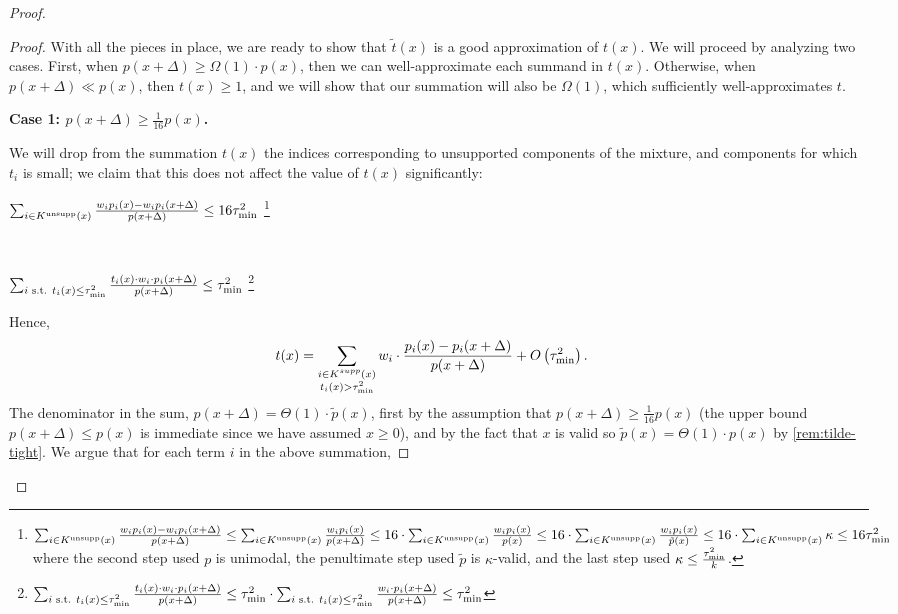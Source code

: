 \begin{proof}
\begin{proof}
    

    

    With all the pieces in place, we are ready to show that $\tilde{t}(x)$ is a good approximation of $t(x)$. 
    We will proceed by analyzing two cases.
    First, when $p(x+\Delta) \ge \Omega(1) \cdot p(x)$, then we can well-approximate each summand in $t(x)$.
    Otherwise, when $p(x+\Delta) \ll p(x)$, then $t(x) \ge 1$, and we will show that our summation will also be $\Omega(1)$, which sufficiently well-approximates $t$.

    \textbf{Case 1: $p(x+\Delta) \ge \frac{1}{16} p(x)$.} 








We will drop from the summation $t(x)$ the indices corresponding to unsupported components of the mixture, and components for which $t_i$ is small; we claim that this does not affect the value of $t(x)$ significantly:

    \begin{remark}\label{rem:und-negl}
        $\sum_{i \in K^{\textrm{unsupp}}(x)} \frac{w_i p_i(x) - w_i p_i(x+\Delta)}{p(x+\Delta)} \le 16\tau_{\textrm{min}}^2$
        \footnote{$\sum_{i \in K^{\textrm{unsupp}}(x)} \frac{w_i p_i(x) - w_i p_i(x+\Delta)}{p(x+\Delta)} \le \sum_{i \in K^{\textrm{unsupp}}(x)} \frac{w_i p_i(x)}{p(x+\Delta)} \le 16 \cdot \sum_{i \in K^{\textrm{unsupp}}(x)} \frac{w_i p_i(x)}{p(x)} \le  16 \cdot \sum_{i \in K^{\textrm{unsupp}}(x)} \frac{w_i p_i(x)}{\tilde{p}(x)} \le  16 \cdot \sum_{i \in K^{\textrm{unsupp}}(x)} \kappa \le  16 \tau_{\textrm{min}}^2$ where the second step used $p$ is unimodal, the penultimate step used $\tilde{p}$ is $\kappa$-valid, and the last step used $\kappa \le \frac{\tau_{\textrm{min}}^2}{k}$.}
    \end{remark}\

    \begin{remark}\label{rem:small-ti-negl}
        $\sum_{i \textrm{ s.t. } t_i(x) \le \tau_{\textrm{min}}^2} \frac{t_i(x) \cdot w_i \cdot p_i(x+\Delta)}{p(x+\Delta)} \le \tau_{\textrm{min}}^2$
        \footnote{$\sum_{i \textrm{ s.t. } t_i(x) \le \tau_{\textrm{min}}^2} \frac{t_i(x) \cdot w_i \cdot p_i(x+\Delta)}{p(x+\Delta)} \le \tau_{\textrm{min}}^2 \cdot \sum_{i \textrm{ s.t. } t_i(x) \le \tau_{\textrm{min}}^2} \frac{w_i \cdot p_i(x+\Delta)}{p(x+\Delta)} \le \tau_{\textrm{min}}^2$}
    \end{remark}

Hence, 
\begin{align*}
t(x) &= \sum_{\substack{i \in K^{supp}(x)\\t_i(x) > \tau_{\textrm{min}}^2}} w_i\cdot \frac{p_i(x) - p_i(x+\Delta)}{p(x+\Delta)} + O\left(\tau_{\textrm{min}}^2\right).
\end{align*}
The denominator in the sum, $p(x+\Delta) = \Theta(1) \cdot \tilde{p}(x)$, first by the assumption that $p(x+\Delta) \ge \frac{1}{16} p(x)$ (the upper bound $p(x+\Delta) \le p(x)$ is immediate since we have assumed $x \ge 0$), and by the fact that $x$ is valid so $\tilde{p}(x) = \Theta(1) \cdot p(x)$ by \cref{rem:tilde-tight}.
We argue that for each term $i$ in the above summation, 


\end{proof}
\end{proof}
